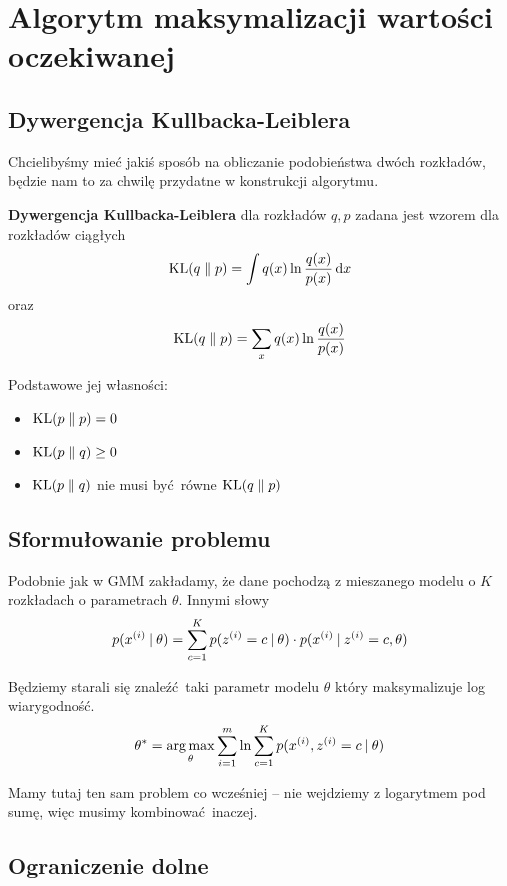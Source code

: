 \section{Algorytm maksymalizacji wartości oczekiwanej}

\subsection{Dywergencja Kullbacka-Leiblera}
Chcielibyśmy mieć jakiś sposób na obliczanie podobieństwa dwóch rozkładów, będzie nam to za chwilę przydatne w konstrukcji algorytmu.

\begin{definition}
\textbf{Dywergencja Kullbacka-Leiblera} dla rozkładów \( q, p \) zadana jest wzorem dla rozkładów ciągłych
\[
    \KL{q}{p} = \int q(x) \ln \frac{q(x)}{p(x)} \diff x
\]
oraz
\[
    \KL{q}{p} = \sum_x q(x) \ln \frac{q(x)}{p(x)}
\]
\end{definition}

Podstawowe jej własności:
\begin{itemize}
    \item \( \KL{p}{p} = 0 \)
    \item \( \KL{p}{q} \geq 0 \)
    \item \( \KL{p}{q} \) nie musi być równe \( \KL{q}{p} \)
\end{itemize}

\subsection{Sformułowanie problemu}

Podobnie jak w GMM zakładamy, że dane pochodzą z mieszanego modelu o \( K \) rozkładach o parametrach \( \theta \).
Innymi słowy
\[
    p(x^{(i)} \:\vert\: \theta) = \sum_{c=1}^K p(z^{(i)} = c \:\vert\: \theta) \cdot p(x^{(i)} \:\vert\: z^{(i)} = c, \theta)
\]

Będziemy starali się znaleźć taki parametr modelu \( \theta \) który maksymalizuje log wiarygodność.
\[
    \theta^* = \operatorname*{arg\,max}_\theta \sum_{i=1}^m \ln \sum_{c=1}^K p(x^{(i)}, z^{(i)} = c \:\vert\: \theta)
\]

Mamy tutaj ten sam problem co wcześniej -- nie wejdziemy z logarytmem pod sumę, więc musimy kombinować inaczej.

\subsection{Ograniczenie dolne}

